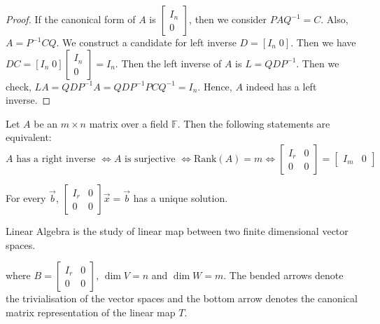 \documentclass[
	11pt, %
	fleqn, %
	a4paper, %
]{LegrandOrangeBook}
\newcommand{\F}{\mathbb{F}} %
\newcommand{\rank}[1]{\text{Rank}(#1)} %
\begin{document}
\begin{proof}
    If the canonical form of $A$ is $\begin{bmatrix}
        I_n \\
        0
    \end{bmatrix}$, then we consider $PAQ^{-1} = C$. Also, $A = P^{-1}CQ$. We construct a candidate for left inverse $D = [I_n \; 0]$. Then we have $DC = [I_n \; 0] \begin{bmatrix}
        I_n \\
        0
    \end{bmatrix} = I_n$. Then the left inverse of $A$ is $L = QDP^{-1}$. Then we check, $LA = QDP^{-1}A = QDP^{-1}PCQ^{-1} = I_n$. Hence, $A$ indeed has a left inverse.
\end{proof}

\begin{proposition}
    Let $A$ be an $m \times n$ matrix over a field $\F$. Then the following statements are equivalent:
    \[
        A \text{ has a right inverse } \iff A \text{ is surjective } \iff \rank{A} = m \iff \begin{bmatrix}
            I_r & 0 \\
            0 & 0
        \end{bmatrix} = \begin{bmatrix}
            I_m & 0
        \end{bmatrix}
    \]
\end{proposition}

\begin{proposition}
    For every $\vec{b}$, $\begin{bmatrix}
        I_r & 0 \\
        0 & 0
    \end{bmatrix} \vec{x} = \vec{b}$ has a unique solution.
\end{proposition}

Linear Algebra is the study of linear map between two finite dimensional vector spaces.

\begin{center}
\end{center}
where $B = \begin{bmatrix}
    I_r & 0 \\
    0 & 0
\end{bmatrix}$, $\dim V = n$ and $\dim W = m$.
The bended arrows denote the trivialisation of the vector spaces and the bottom arrow denotes the canonical matrix representation of the linear map $T$.
\end{document}
